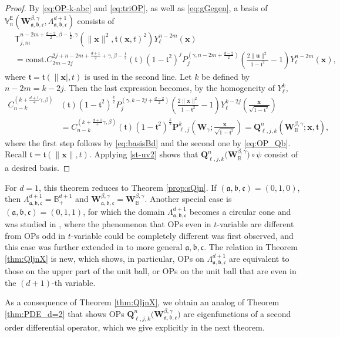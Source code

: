 \documentclass{amsart}
\theoremstyle{remark}
\def\sE{{\mathsf E}}
\def\sT{{\mathsf T}}
\def\fa{{\mathfrak a}}
\def\fb{{\mathfrak b}}
\def\fc{{\mathfrak c}}
\def\ft{{\mathfrak t}}
\def\b{{\beta}}
\def\g{{\gamma}}
\def\ub{{\mathbf u}}
\def\xb{{\mathbf x}}
\def\Pb{{\mathbf P}}
\def\Qb{{\mathbf Q}}
\def\Wb{{\mathbf W}}
\def\BB{{\mathbb B}}
\def\VV{{\mathbb V}}
\def\f{\frac}
\begin{document}
\begin{proof}
By \eqref{eq:OP-k-abc} and \eqref{eq:triOP}, as well as \eqref{eq:gGegen}, a basis of 
$\VV_n^\sE(\Wb_{\fa,\fb,\fc}^{\b,\g}, \Lambda_{\fa,\fb,\fc}^{d+1})$ consists of 
\begin{align*}
   & \sT_{j,m}^{n-2m +\frac{d-2}{2},\b -\f12, \g} \left(\|\xb\|^2, \ft(\xb,t)^2 \right) Y_\ell^{n-2m} (\xb) \\
  & = \mathrm{const.} C_{2m-2j}^{2j+n-2m+\frac{d+1}{2}+\g,\b-\f12}(\ft) (1-\ft^2)^j P_j^{(\g, n-2m +\frac{d-2}{2})}
  \left (\frac{2\|\ub\|^2}{1-\ft^2} -1\right)Y_\ell^{n-2m} (\xb), 
\end{align*}  
where $\ft = \ft(\|\xb|,t)$ is used in the second line. Let $k$ be defined by $n-2m = k-2j$. Then the last expression
becomes, by the homogeneity of $Y_\ell^k$,  
\begin{align*}
 C_{n-k}^{(k + \frac{d+1} +\g,\b)}& (\ft)  (1-\ft^2)^{\frac{k}{2}}
     P_j^{(\g, k-2j+\frac{d-2}{2})}\left (\frac{2\|\xb\|^2}{1-\ft^2} -1\right)Y_\ell^{k-2j} \left(\frac{\xb}{\sqrt{1-\ft^2}}\right)  \\
  & =       C_{n-k}^{(k + \frac{d+1} +\g,\b)}(\ft) (1-\ft^2)^{\frac{k}{2}} \Pb_{\ell,j}^k \left(\Wb_\g; \frac{\xb}{\sqrt{1-\ft^2}}\right)
  = \Qb_{\ell, j,k}^n (\Wb_\BB^{\b,\g}; \xb, \ft),
\end{align*} 
where the first step follows by \eqref{eq:basisBd} and the second one by \eqref{eq:OP_Qb}. Recall $\ft = \ft(\|\xb\|,t)$. 
Applying \eqref{st-uv2} shows that $ \Qb_{\ell, j, k}^n \big(\Wb_\BB^{\b,\g}\big) \circ \psi$ consist of a
desired basis. 
\end{proof}

For $d =1$, this theorem reduces to Theorem \ref{prop:sQjn}. If $(\fa, \fb, \fc) = (0, 1, 0)$, then 
$\Lambda_{\fa,\fb,\fc}^{d+1} = \BB_+^{d+1}$ and $\Wb_{\fa,\fb,\fc}^{\b,\g} = \Wb_{\BB}^{\b,\g}$. Another 
special case is $(\fa, \fb,\fc) = (0,1,1)$, for which the domain $\Lambda_{\fa,\fb,\fc}^{d+1}$ becomes a circular cone
and was studied in \cite{X21a}, where the phenomenon that OPs even in $t$-variable are different from OPs odd in
$t$-variable could be completely different was first observed, and this case was further extended in \cite{X24} to more
general $\fa,\fb,\fc$. The relation in Theorem \ref{thm:QljnX} is new, which shows, in particular, OPs on 
$\Lambda_{\fa,\fb,\fc}^{d+1}$ are equivalent to those on the upper part of the unit ball, or OPs on the unit ball that are 
even in the $(d+1)$-th variable.  

As a consequence of Theorem \ref{thm:QljnX}, we obtain an analog of Theorem \ref{thm:PDE_d=2} that shows
OPs $\Qb_{\ell, j, k}^n\big(\Wb_{\fa,\fb,\fc}^{\b,\g} \big)$ are eigenfunctions of a second
order differential operator, which we give explicitly in the next theorem. 
\end{document}
